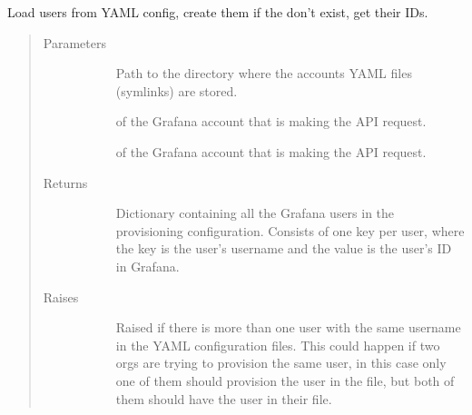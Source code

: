 \documentclass[letterpaper,10pt,english]{sphinxmanual}
\begin{document}

\begin{fulllineitems}
\label{\detokenize{accounts:gpAccounts.loadProvisionedUsers}}
Load users from YAML config, create them if the don’t exist, get their IDs.
\begin{quote}\begin{description}
\item[{Parameters}] \leavevmode\begin{description}
\item[{}] \leavevmode{[}\sphinxtitleref{str}{]}
Path to the directory where the accounts YAML files (symlinks) are stored.

\item[{}] \leavevmode{[}\sphinxtitleref{str}{]}
 of the Grafana account that is making the API request.

\item[{}] \leavevmode{[}\sphinxtitleref{str}{]}
 of the Grafana account that is making the API request.

\end{description}

\item[{Returns}] \leavevmode\begin{description}
\item[{}] \leavevmode{[}\sphinxtitleref{dict}{]}
Dictionary containing all the Grafana users in the provisioning 
configuration. Consists of one key per user, where the key is the user’s
username and the value is the user’s ID in Grafana.

\end{description}

\item[{Raises}] \leavevmode\begin{description}
\item[{}] \leavevmode
Raised if there is more than one user with the same username in the YAML
configuration files. This could happen if two orgs are trying to provision
the same user, in this case only one of them should provision the user in
the  file, but both of them should have the user in their
 file.


\end{description}
\end{description}
\end{quote}
\end{fulllineitems}
\end{document}
